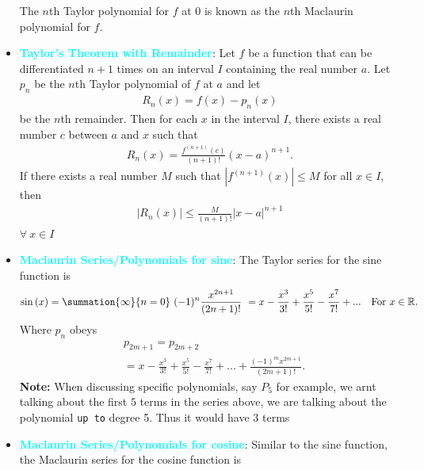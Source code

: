 \documentclass{report}
\begin{document}
\begin{itemize}
                The $n$th Taylor polynomial for $f$ at $0$ is known as the $n$th Maclaurin polynomial for $f$.
            \item \textbf{\textcolor{cyan}{Taylor’s Theorem with Remainder}}:
                Let $f$ be a function that can be differentiated $n+1$ times on an interval $I$ containing the real number $a$. Let $p_n$ be the $n$th Taylor polynomial of $f$ at $a$ and let
                \begin{align*}
                    R_n(x) = f(x) - p_n(x)
                \end{align*}
                be the $n$th remainder. Then for each $x$ in the interval $I$, there exists a real number $c$ between $a$ and $x$ such that
                \begin{align*}
                    R_n(x) = \frac{f^{(n+1)}(c)}{(n+1)!}(x - a)^{n+1}.
                \end{align*}
                If there exists a real number $M$ such that $\left|f^{(n+1)}(x)\right| \leq M$ for all $x \in I$, then
                \begin{align*}
                    \left|R_n(x)\right| \leq \frac{M}{(n+1)!}\left|x - a\right|^{n+1}
                \end{align*}
                $\forall\ x \in I$ 
            \item \textbf{\textcolor{cyan}{Maclaurin Series/Polynomials for sine}}:
                The Taylor series for the sine function is 
                \begin{align*}
                    \sin{(x)} = \summation{\infty}{n=0}\ (-1)^{n}\frac{x^{2n+1}}{(2n+1)!}\ = x-\frac{x^{3}}{3!} + \frac{x^{5}}{5!} - \frac{x^{7}}{7!}  + ... \quad \text{For } x\in\mathbb{R} 
                .\end{align*}
                Where $p_{n}$ obeys
                \begin{align*}
                   &p_{2m+1} = p_{2m+2} \\
                   &=x-\frac{x^{3}}{3!}+\frac{x^{5}}{5!}-\frac{x^{7}}{7!} + ... + \frac{(-1)^{m}x^{2m+1}}{(2m+1)!}
               .\end{align*}
               \textbf{Note:} When discussing specific polynomials, say $P_5 $ for example, we arnt talking about the first $5$ terms in the series above, we are talking about the polynomial \texttt{up to} degree 5. Thus it would have 3 terms
           \item \textbf{\textcolor{cyan}{Maclaurin Series/Polynomials for cosine}}: Similar to the sine function, the Maclaurin series for the cosine function is 

\end{itemize}
\end{document}
